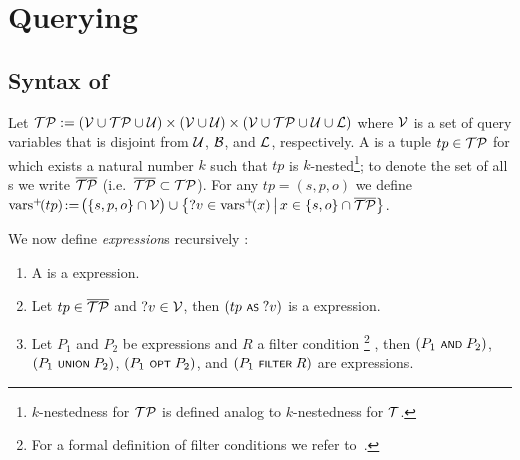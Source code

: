 \section{Querying} \label{Section:Querying}



\subsection{Syntax of {\SPARQLplus}}

	Let $\mathcal{TP} := (\mathcal{V} \cup \mathcal{TP} \cup \mathcal{U}) \times (\mathcal{V} \cup \mathcal{U}) \times (\mathcal{V} \cup \mathcal{TP} \cup \mathcal{U} \cup \mathcal{L})$ where $\mathcal{V}$ is a set of query variables that is disjoint from $\mathcal{U}$, $\mathcal{B}$, and $\mathcal{L}$, respectively.
A \emph{\TPplus} is a tuple $tp \in \mathcal{TP}$ for which exists a natural number $k$ such that $tp$ is $k$-nested\footnote{$k$-nestedness for $\mathcal{TP}$ is defined analog to $k$-nestedness for $\mathcal{T}$.}; to denote the set of all {\TPplus}s we write $\overline{\mathcal{TP}}$ (i.e.~$\overline{\mathcal{TP}} \subset \mathcal{TP}$).
	For any {\TPplus} $tp \!=\! (s,p,o)$ we define $\mathrm{vars}^+\!(tp) \!:=\! \bigl( \lbrace s,p,o \rbrace \cap \mathcal{V} \bigr) \cup \big\lbrace ?v \in \mathrm{vars}^+\!(x) \,\big|\, x \in \lbrace s,o \rbrace \cap \overline{\mathcal{TP}} \big\rbrace$.

	We now define \emph{{\SPARQLplus} expression}s recursively :
\begin{enumerate}
	\item A \emph{\TPplus} is a {\SPARQLplus} expression.
	\item Let $tp \in \overline{\mathcal{TP}}$ and $?v \in \mathcal{V}$, then $(tp \text{ \normalfont\scriptsize\textsf{AS} } ?v)$ is a {\SPARQLplus} expression.
	\item Let $P_1$ and $P_2$ be {\SPARQLplus} expressions and $R$ a filter condition%
		\footnote{For a formal definition of
		filter conditions we refer to~\cite{Perez09:SemanticsAndComplexityOfSPARQL}.}%
	, then $(P_1 \text{ \normalfont\scriptsize\textsf{AND} } P_2)$, $(P_1 \text{ \normalfont\scriptsize\textsf{UNION} } P_2)$, $(P_1 \text{ \normalfont\scriptsize\textsf{OPT} } P_2)$, and $(P_1 \text{ \normalfont\scriptsize\textsf{FILTER} } R)$ are {\SPARQLplus} expressions.
\end{enumerate}

